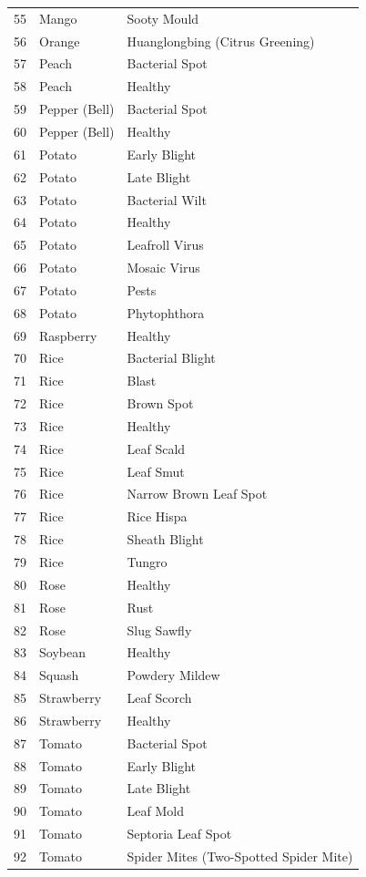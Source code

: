 \begin{longtable}{@{}C{1.6cm} L{4.2cm} L{8.1cm}@{}}
55 & Mango & Sooty Mould \\
56 & Orange & Huanglongbing (Citrus Greening) \\
57 & Peach & Bacterial Spot \\
58 & Peach & Healthy \\
59 & Pepper (Bell) & Bacterial Spot \\
60 & Pepper (Bell) & Healthy \\
61 & Potato & Early Blight \\
62 & Potato & Late Blight \\
63 & Potato & Bacterial Wilt \\
64 & Potato & Healthy \\
65 & Potato & Leafroll Virus \\
66 & Potato & Mosaic Virus \\
67 & Potato & Pests \\
68 & Potato & Phytophthora \\
69 & Raspberry & Healthy \\
70 & Rice & Bacterial Blight \\
71 & Rice & Blast \\
72 & Rice & Brown Spot \\
73 & Rice & Healthy \\
74 & Rice & Leaf Scald \\
75 & Rice & Leaf Smut \\
76 & Rice & Narrow Brown Leaf Spot \\
77 & Rice & Rice Hispa \\
78 & Rice & Sheath Blight \\
79 & Rice & Tungro \\
80 & Rose & Healthy \\
81 & Rose & Rust \\
82 & Rose & Slug Sawfly \\
83 & Soybean & Healthy \\
84 & Squash & Powdery Mildew \\
85 & Strawberry & Leaf Scorch \\
86 & Strawberry & Healthy \\
87 & Tomato & Bacterial Spot \\
88 & Tomato & Early Blight \\
89 & Tomato & Late Blight \\
90 & Tomato & Leaf Mold \\
91 & Tomato & Septoria Leaf Spot \\
92 & Tomato & Spider Mites (Two-Spotted Spider Mite) \\

\end{longtable}
